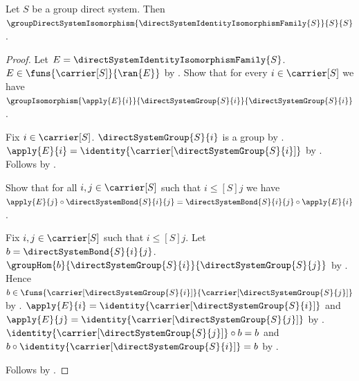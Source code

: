 \begin{theorem}\label{identity_group_direct_system_isomorphism}
    Let $S$ be a group direct system.
    Then $\groupDirectSystemIsomorphism
        {\directSystemIdentityIsomorphismFamily{S}}{S}{S}$.
\end{theorem}
\begin{proof}
    Let $E=\directSystemIdentityIsomorphismFamily{S}$.
    $E\in\funs{\carrier[S]}{\ran{E}}$ by
        .
    Show that for every $i\in\carrier[S]$ we have
        $\groupIsomorphism{\apply{E}{i}}
            {\directSystemGroup{S}{i}}{\directSystemGroup{S}{i}}$.
    \begin{subproof}
        Fix $i\in\carrier[S]$.
        $\directSystemGroup{S}{i}$ is a group by
            .
        $\apply{E}{i}=\identity{\carrier[\directSystemGroup{S}{i}]}$ by
            .
        Follows by .
    \end{subproof}
    Show that for all $i,j\in\carrier[S]$ such that
        $i\mathrel{\leq[S]}j$ we have
        $\apply{E}{j}\circ\directSystemBond{S}{i}{j}
            =\directSystemBond{S}{i}{j}\circ\apply{E}{i}$.
    \begin{subproof}
        Fix $i,j\in\carrier[S]$ such that $i\mathrel{\leq[S]}j$.
        Let $b=\directSystemBond{S}{i}{j}$.
        $\groupHom{b}{\directSystemGroup{S}{i}}
            {\directSystemGroup{S}{j}}$ by
            .
        Hence $b\in
            \funs{\carrier[\directSystemGroup{S}{i}]}
                {\carrier[\directSystemGroup{S}{j}]}$ by
            .
        $\apply{E}{i}=\identity{\carrier[\directSystemGroup{S}{i}]}$ and
            $\apply{E}{j}=\identity{\carrier[\directSystemGroup{S}{j}]}$ by
            .
        $\identity{\carrier[\directSystemGroup{S}{j}]}\circ b=b$ and
            $b\circ\identity{\carrier[\directSystemGroup{S}{i}]}=b$ by
            .
    \end{subproof}
    Follows by .
\end{proof}

